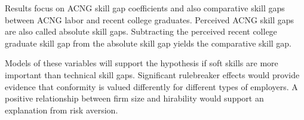 Results focus on ACNG skill gap coefficients
and also comparative skill gaps between ACNG labor and recent college graduates.
Perceived ACNG skill gaps are also called absolute skill gaps.
Subtracting the perceived recent college graduate skill gap from the absolute skill gap yields the comparative skill gap.

Models of these variables will support the hypothesis if soft skills are more important than technical skill gaps.
Significant rulebreaker effects would provide evidence that conformity is valued differently for different types of employers.
A positive relationship between firm size and hirability would support an explanation from risk aversion.



%

